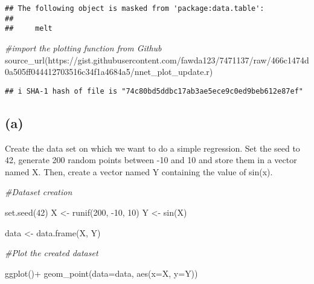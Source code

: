 \documentclass[
]{article}
\newenvironment{Shaded}{\begin{snugshade}}{\end{snugshade}}
\newcommand{\AttributeTok}[1]{\textcolor[rgb]{0.77,0.63,0.00}{#1}}
\newcommand{\CommentTok}[1]{\textcolor[rgb]{0.56,0.35,0.01}{\textit{#1}}}
\newcommand{\DecValTok}[1]{\textcolor[rgb]{0.00,0.00,0.81}{#1}}
\newcommand{\FunctionTok}[1]{\textcolor[rgb]{0.00,0.00,0.00}{#1}}
\newcommand{\NormalTok}[1]{#1}
\newcommand{\OtherTok}[1]{\textcolor[rgb]{0.56,0.35,0.01}{#1}}
\newcommand{\SpecialCharTok}[1]{\textcolor[rgb]{0.00,0.00,0.00}{#1}}
\newcommand{\StringTok}[1]{\textcolor[rgb]{0.31,0.60,0.02}{#1}}
\begin{document}
\begin{verbatim}
## The following object is masked from 'package:data.table':
## 
##     melt
\end{verbatim}

\begin{Shaded}
\begin{Highlighting}[]
\CommentTok{\#import the plotting function from Github}
\FunctionTok{source\_url}\NormalTok{(}\StringTok{\textquotesingle{}https://gist.githubusercontent.com/fawda123/7471137/raw/466c1474d0a505ff044412703516c34f1a4684a5/nnet\_plot\_update.r\textquotesingle{}}\NormalTok{)}
\end{Highlighting}
\end{Shaded}

\begin{verbatim}
## i SHA-1 hash of file is "74c80bd5ddbc17ab3ae5ece9c0ed9beb612e87ef"
\end{verbatim}

\hypertarget{a}{%
\subsection{(a)}\label{a}}

Create the data set on which we want to do a simple regression. Set the
seed to 42, generate 200 random points between -10 and 10 and store them
in a vector named X. Then, create a vector named Y containing the value
of sin(x).

\begin{Shaded}
\begin{Highlighting}[]
\CommentTok{\#Dataset creation}

\FunctionTok{set.seed}\NormalTok{(}\DecValTok{42}\NormalTok{)}
\NormalTok{X }\OtherTok{\textless{}{-}} \FunctionTok{runif}\NormalTok{(}\DecValTok{200}\NormalTok{, }\SpecialCharTok{{-}}\DecValTok{10}\NormalTok{, }\DecValTok{10}\NormalTok{)}
\NormalTok{Y }\OtherTok{\textless{}{-}} \FunctionTok{sin}\NormalTok{(X)}

\NormalTok{data }\OtherTok{\textless{}{-}} \FunctionTok{data.frame}\NormalTok{(X, Y)}

\CommentTok{\#Plot the created dataset}

\FunctionTok{ggplot}\NormalTok{()}\SpecialCharTok{+}
  \FunctionTok{geom\_point}\NormalTok{(}\AttributeTok{data=}\NormalTok{data, }\FunctionTok{aes}\NormalTok{(}\AttributeTok{x=}\NormalTok{X, }\AttributeTok{y=}\NormalTok{Y))}
\end{Highlighting}
\end{Shaded}
\end{document}
